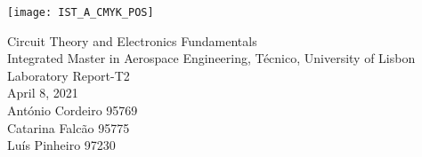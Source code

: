 

\thispagestyle {empty}

\texttt{[image: IST\_A\_CMYK\_POS]}

\begin{center}
%
\vspace{1.0cm}



\vspace{1cm}
{\FontLb Circuit Theory and Electronics Fundamentals} \\ 
\vspace{1cm}
{\FontSn Integrated Master in Aerospace Engineering, Técnico, University of Lisbon} \\ 
\vspace{1cm}
{\FontSn Laboratory Report-T2} \\
\vspace{1cm}
{\FontSn April 8, 2021} \\ 
\vspace{1cm}
{\FontSn António Cordeiro 95769} \\ 
\vspace{00.5cm}
{\FontSn Catarina Falcão 95775} \\ 
\vspace{0.5cm}
{\FontSn Luís Pinheiro 97230} \\ 
\end{center}

\newpage
